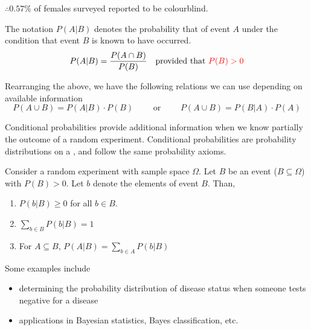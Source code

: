 \begin{example}
\begin{enumerate}[label=\alph*)]
\begin{minipage}[t]{0.45\linewidth}
            $\therefore 0.57\%$ of females surveyed reported to be colourblind. 
        \end{minipage}
    \end{enumerate}
\end{example}

\begin{definition}
    The notation $P(A | B)$ denotes the probability that of event $A$ under the condition that event $B$ is known to have occurred. $$P(A | B) = \frac{P(A \cap B)}{P(B)} \quad \text{provided that } \color{red} P(B) > 0$$
\end{definition}

Rearranging the above, we have the following relations we can use depending on available information $$P(A \cup B) = P(A | B) \cdot P(B) \qquad \text{ or } \qquad P(A \cup B) = P(B | A) \cdot P(A)$$

Conditional probabilities provide additional information when we know partially the outcome of a random experiment. Conditional probabilities are probability distributions on a , and follow the same probability
axioms.

\begin{axiom}
    Consider a random experiment with sample space $\Omega$. Let $B$ be an event ($B \subseteq \Omega$) with $P(B) > 0$. Let $b$ denote the elements of event $B$. Than, 

    \vspace{0.5em}
    \begin{enumerate}
        \item $P(b | B) \ge 0$ for all $b \in B$. 
        \vspace{0.5em}
        \item $\sum_{b \in B} P(b | B) = 1$
        \item For $A \subseteq B$, $P(A | B) = \sum_{b \in A} P(b | B)$
    \end{enumerate}
\end{axiom}

Some examples include 
\begin{itemize}
    \item determining the probability distribution of disease status when someone tests negative for a disease 
    \item applications in Bayesian statistics, Bayes classification, etc.
\end{itemize}

